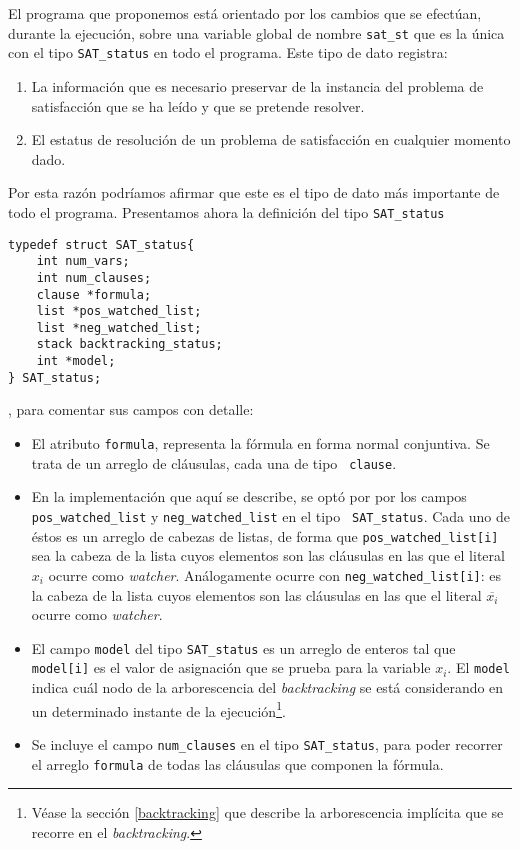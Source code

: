 \documentclass[12pt,lettersize,oneside]{article}
\begin{document}
El programa que proponemos está orientado por los cambios que se efectúan,
durante la ejecución, sobre una variable global de nombre {\tt sat\_st} que es la
única con el tipo {\tt SAT\_status} en todo el programa. 
Este tipo de dato registra: \vspace{-4.5mm}
\begin{enumerate}
\item La información que es necesario preservar de la instancia del problema de
  satisfacción que se ha leído y que se pretende resolver.
\item El estatus de resolución de un problema de satisfacción en cualquier
  momento dado.
\end{enumerate}
Por esta razón podríamos afirmar que este es el tipo de dato más importante de
todo el programa.
Presentamos ahora la definición del tipo {\tt SAT\_status}
\begin{lstlisting}
typedef struct SAT_status{    
    int num_vars;
    int num_clauses;
    clause *formula;
    list *pos_watched_list;
    list *neg_watched_list;
    stack backtracking_status;
    int *model;                     
} SAT_status;
\end{lstlisting}
, para comentar sus campos con detalle:\vspace{-2.5mm}
\begin{itemize}
\item El atributo {\tt formula}, representa la fórmula en forma normal
  conjuntiva. Se trata de un arreglo de cláusulas, cada una de tipo {\tt
    clause}.
\item En la implementación que aquí se describe, se optó por por los campos {\tt
    pos\_watched\_list} y {\tt neg\_watched\_list} en el tipo {\tt
    SAT\_status}. Cada uno de éstos es un arreglo de cabezas de listas, de forma
  que {\tt pos\_watched\_list[i]} sea la cabeza de la lista cuyos elementos son
  las cláusulas en las que el literal $x_i$ ocurre como
  \emph{watcher}. Análogamente ocurre con {\tt neg\_watched\_list[i]}: es la
  cabeza de la lista cuyos elementos son las cláusulas en las que el literal
  $\overline{x_i}$ ocurre como \emph{watcher}.

\item El campo {\tt model} del tipo {\tt SAT\_status} es un arreglo de enteros
  tal que {\tt model[i]} es el valor de asignación que se prueba para la
  variable $x_i$. El {\tt model} indica cuál nodo de la arborescencia del
  \emph{backtracking} se está considerando en un determinado instante de la
  ejecución\footnote{Véase la sección \ref{backtracking} que describe la
    arborescencia implícita que se recorre en el \emph{backtracking}.}.

\item Se incluye el campo {\tt num\_clauses} en el tipo {\tt SAT\_status}, para
  poder recorrer el arreglo {\tt formula} de todas las cláusulas que componen la
  fórmula.
\end{itemize}
\end{document}
